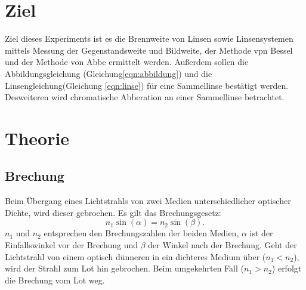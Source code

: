 \section{Ziel}
\label{sec:Ziel}
Ziel dieses Experiments ist es die Brennweite von Linsen sowie Linsensystemen mittels Messung der Gegenstandsweite und Bildweite, der Methode vpn Bessel und der Methode von Abbe ermittelt werden. Außerdem sollen die Abbildungsgleichung (Gleichung\ref{eqn:abbildung}) und die Linsengleichung(Gleichung \ref{eqn:linse})  für eine Sammellinse bestätigt werden. Desweiteren wird chromatische Abberation an einer Sammellinse betrachtet.


\section{Theorie}
\label{sec:theorie}
\subsection{Brechung}
Beim Übergang eines Lichtstrahls von zwei Medien unterschiedlicher optischer Dichte, wird dieser gebrochen. Es gilt das Brechungsgesetz:
\begin{equation}
n_1 \sin(\alpha)=n_2 \sin(\beta).
\end{equation}
$n_1$ und $n_2$ entsprechen den Brechungszahlen der beiden Medien, $\alpha$ ist der Einfallswinkel vor der Brechung und $\beta$ der Winkel nach der Brechung. Geht der Lichtstrahl von einem optisch dünneren in ein dichteres Medium über ($n_1 < n_2$), wird der Strahl zum Lot hin gebrochen. Beim umgekehrten Fall ($n_1 > n_2$) erfolgt die Brechung vom Lot weg.
